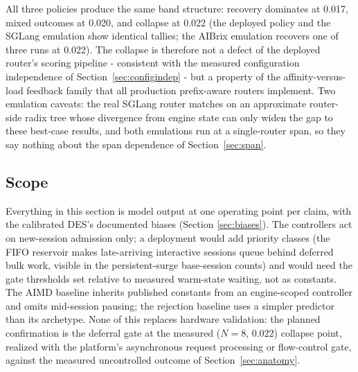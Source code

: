 All three policies produce the same band structure: recovery
dominates at 0.017, mixed outcomes at 0.020, and collapse at 0.022
(the deployed policy and the SGLang emulation show identical
tallies; the AIBrix emulation recovers one of three runs at 0.022).
The collapse is therefore not a defect of the deployed router's
scoring pipeline - consistent with the measured configuration
independence of Section~\ref{sec:configindep} - but a property of the
affinity-versus-load feedback family that all production
prefix-aware routers implement. Two emulation caveats: the real
SGLang router matches on an approximate router-side radix tree
whose divergence from engine state can only widen the gap to these
best-case results, and both emulations run at a single-router span,
so they say nothing about the span dependence of Section~\ref{sec:span}.

\subsection{Scope}
\label{sec:mitscope}

Everything in this section is model output at one operating point
per claim, with the calibrated DES's documented biases (Section
\ref{sec:biases}). The controllers act on new-session admission only; a
deployment would add priority classes (the FIFO reservoir makes
late-arriving interactive sessions queue behind deferred bulk work,
visible in the persistent-surge base-session counts) and would need
the gate thresholds set relative to measured warm-state waiting, not
as constants. The AIMD baseline inherits published constants from an
engine-scoped controller and omits mid-session pausing; the
rejection baseline uses a simpler predictor than its archetype. None
of this replaces hardware validation: the planned confirmation is
the deferral gate at the measured ($N{=}8$, 0.022) collapse point,
realized with the platform's asynchronous request processing or
flow-control gate, against the measured uncontrolled outcome of
Section~\ref{sec:anatomy}.
